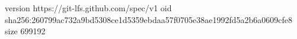 version https://git-lfs.github.com/spec/v1
oid sha256:260799ac732a9bd5308ce1d5359ebdaa57f0705e38ae1992fd5a2b6a0609cfe8
size 699192
